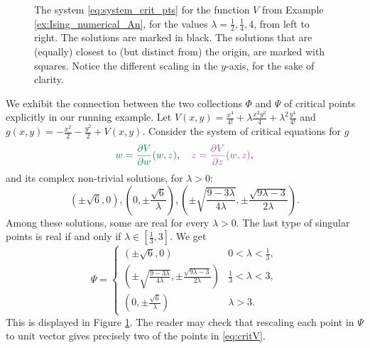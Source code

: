 \documentclass[english]{ourlematemasingle}
\numberwithin{theorem}{section}
\theoremstyle{remark}
\newenvironment{example}
{\pushQED{\qed}\renewcommand{\qedsymbol}{$\diamond$}\examplex}
{\popQED\endexamplex}
\begin{document}
\begin{figure}

    
\fi
    \caption{The system \eqref{eq:system_crit_pts} for the function $V$ from Example \ref{ex:Ising_numerical_An}, for the values $\lambda = \frac{1}{2}, \frac{1}{4}, 4$, from left to right. The solutions are marked in black. The solutions that are (equally) closest to (but distinct from) the origin, are marked with squares. Notice the different scaling in the $y$-axis, for the sake of clarity.}
    \label{fig:sing_various_lambdas}
\end{figure}
We exhibit the connection between the two collections $\Phi$ and $\Psi$ of critical points explicitly in our running example.
\begin{example}\label{ex:Ising_numerical_An}
    Let $V(x,y) = \frac{x^4}{4!} + \lambda \frac{x^2 y^2}{4} + \lambda^2 \frac{y^4}{4!}$ and $g(x,y) = -\frac{x^2}{2} - \frac{y^2}{2} + V(x,y)$.
    Consider the system of critical equations for $g$
    \begin{equation}\label{eq:system_crit_pts}
        {\color{cb-green} w = \frac{\partial V}{\partial w}(w,z)}, \quad
        {\color{cb-purple} z = \frac{\partial V}{\partial z}(w,z)},
    \end{equation}
    and its complex non-trivial solutions, for $\lambda>0$:
    \[
     (\pm \sqrt{6}, 0), \left(0,\pm \frac{\sqrt{6}}{\lambda}\right), \left( \pm \sqrt{\frac{9-3\lambda}{4\lambda}}, \pm \frac{\sqrt{9 \lambda -3}}{2\lambda} \right).
    \]
    Among these solutions, some are real for every $\lambda>0$. 
    The last type of singular points is real if and only if $\lambda \in [\frac{1}{3}, 3]$. We get
    \[
    \Psi = \begin{cases}
        (\pm\sqrt{6}, 0 ) & 0 < \lambda < \frac{1}{3}, \\
        \left(\pm \sqrt{\tfrac{9-3\lambda}{4\lambda}}, \pm \tfrac{\sqrt{9 \lambda -3}}{2\lambda} \right) & \frac{1}{3} < \lambda < 3, \\
        \left(0, \pm\tfrac{\sqrt{6}}{\lambda} \right) & \lambda > 3. 
    \end{cases}
    \]
    This is displayed in Figure \ref{fig:sing_various_lambdas}. The reader may check that rescaling each point in $\Psi$ to unit vector gives precisely two of the points in \eqref{eq:critV}.
\end{example}
\end{document}
